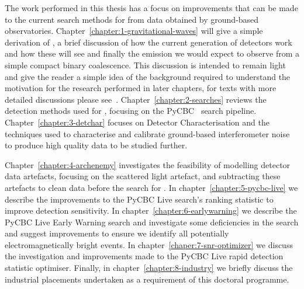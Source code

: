 The work performed in this thesis has a focus on improvements that can be made to the current search methods for \gws from data obtained by ground-based \gwadj observatories. Chapter~\ref{chapter:1-gravitational-waves} will give a simple derivation of \gws, a brief discussion of how the current generation of detectors work and how these will see \gws and finally the \gwadj emission we would expect to observe from a simple compact binary coalescence. This discussion is intended to remain light and give the reader a simple idea of the background required to understand the motivation for the research performed in later chapters, for texts with more detailed discussions please see~\cite{Moore_book:2012, Maggiore_book:2007, Schutz_book:2009}. Chapter~\ref{chapter:2-searches} reviews the detection methods used for \gws, focusing on the PyCBC~\cite{PyCBC:2016} search pipeline. Chapter~\ref{chapter:3-detchar} focuses on Detector Characterisation and the techniques used to characterise and calibrate ground-based interferometer noise to produce high quality data to be studied further.

Chapter~\ref{chapter:4-archenemy} investigates the feasibility of modelling \gwadj detector data artefacts, focusing on the scattered light artefact, and subtracting these artefacts to clean data before the search for \gws. In chapter~\ref{chapter:5-pycbc-live} we describe the improvements to the PyCBC Live search's ranking statistic to improve detection sensitivity. In chapter~\ref{chapter:6-earlywarning} we describe the PyCBC Live Early Warning search and investigate some deficiencies in the search and suggest improvements to ensure we identify all potentially electromagnetically bright events. In chapter~\ref{chaper:7-snr-optimizer} we discuss the investigation and improvements made to the PyCBC Live rapid detection statistic optimiser. Finally, in chapter~\ref{chapter:8-industry} we briefly discuss the industrial placements undertaken as a requirement of this doctoral programme.
